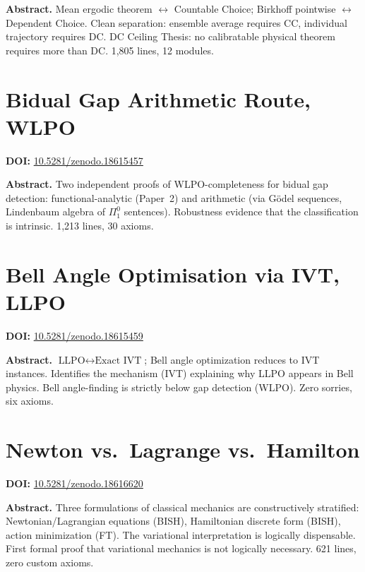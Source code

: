 \documentclass[11pt,a4paper]{article}
\begin{document}
\bigskip
\noindent\textbf{Abstract.}
Mean ergodic theorem $\leftrightarrow$ Countable Choice; Birkhoff pointwise $\leftrightarrow$ Dependent Choice. Clean separation: ensemble average requires CC, individual trajectory requires DC. DC Ceiling Thesis: no calibratable physical theorem requires more than DC. 1,805 lines, 12 modules.

\section{Bidual Gap Arithmetic Route, WLPO}
\label{sec:p26}
\textbf{DOI:} \href{https://doi.org/10.5281/zenodo.18615457}{10.5281/zenodo.18615457}

\bigskip
\noindent\textbf{Abstract.}
Two independent proofs of WLPO-completeness for bidual gap detection: functional-analytic (Paper~2) and arithmetic (via G\"odel sequences, Lindenbaum algebra of $\Pi_1^0$ sentences). Robustness evidence that the classification is intrinsic. 1,213 lines, 30 axioms.

\section{Bell Angle Optimisation via IVT, LLPO}
\label{sec:p27}
\textbf{DOI:} \href{https://doi.org/10.5281/zenodo.18615459}{10.5281/zenodo.18615459}

\bigskip
\noindent\textbf{Abstract.}
$\text{LLPO}\leftrightarrow\text{Exact IVT}$; Bell angle optimization reduces to IVT instances. Identifies the mechanism (IVT) explaining why LLPO appears in Bell physics. Bell angle-finding is strictly below gap detection (WLPO). Zero sorries, six axioms.

\section{Newton vs.\ Lagrange vs.\ Hamilton}
\label{sec:p28}
\textbf{DOI:} \href{https://doi.org/10.5281/zenodo.18616620}{10.5281/zenodo.18616620}

\bigskip
\noindent\textbf{Abstract.}
Three formulations of classical mechanics are constructively stratified: Newtonian/Lagrangian equations (BISH), Hamiltonian discrete form (BISH), action minimization (FT). The variational interpretation is logically dispensable. First formal proof that variational mechanics is not logically necessary. 621 lines, zero custom axioms.
\end{document}
